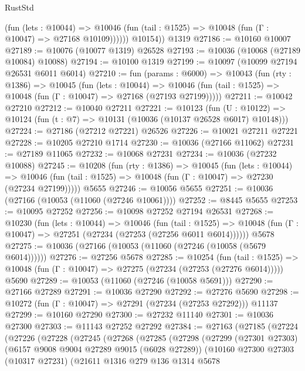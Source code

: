\begin{lexlean}{RustStd}
\begin{coremodule}
{{              (fun (lets : @10044) =>
              @10046 (fun (tail : @1525) => @10048 (fun (Γ : @10047) => @27168 @10109))))))
        @10154))
    @1319
@27186 := @10160 @10007
@27189 := @10076 (@10077 @1319) @26528
@27193 := @10036 (@10068 (@27189 @10084) @10088)
@27194 := @10100 @1319
@27199 := @10097 (@10099 @27194 @26531 @6011 @6014)
@27210 := fun (params : @6000) =>
  @10043
    (fun (rty : @1386) =>
    @10045
      (fun (lets : @10044) =>
      @10046 (fun (tail : @1525) => @10048 (fun (Γ : @10047) => @27168 (@27193 @27199)))))
@27211 := @10042 @27210
@27212 := @10040 @27211
@27221 := @10123
    (fun (U : @10122) => @10124 (fun (t : @7) => @10131 (@10036 (@10137 @26528 @6017) @10148)))
@27224 := @27186 (@27212 @27221) @26526
@27226 := @10021 @27211 @27221
@27228 := @10205 @27210 @1714
@27230 := @10036 (@27166 @11062)
@27231 := @27189 @11065
@27232 := @10068 @27231
@27234 := @10036 (@27232 @10088)
@27245 := @10208
    (fun (rty : @1386) =>
    @10045
      (fun (lets : @10044) =>
      @10046 (fun (tail : @1525) => @10048 (fun (Γ : @10047) => @27230 (@27234 @27199)))))
    @5655
@27246 := @10056 @5655
@27251 := @10036 (@27166 (@10053 (@11060 (@27246 @10061))))
@27252 := @8445 @5655
@27253 := @10095 @27252
@27256 := @10098 @27252 @27194 @26531
@27268 := @10230
    (fun (lets : @10044) =>
    @10046
      (fun (tail : @1525) =>
      @10048 (fun (Γ : @10047) => @27251 (@27234 (@27253 (@27256 @6011 @6014))))))
    @5678
@27275 := @10036 (@27166 (@10053 (@11060 (@27246 (@10058 (@5679 @6014))))))
@27276 := @27256 @5678
@27285 := @10254
    (fun (tail : @1525) => @10048 (fun (Γ : @10047) => @27275 (@27234 (@27253 (@27276 @6014)))))
    @5690
@27289 := @10053 (@11060 (@27246 (@10058 @5691)))
@27290 := @27166 @27289
@27291 := @10036 @27290
@27292 := @27276 @5690
@27298 := @10272 (fun (Γ : @10047) => @27291 (@27234 (@27253 @27292))) @11137
@27299 := @10160 @27290
@27300 := @27232 @11140
@27301 := @10036 @27300
@27303 := @11143 @27252 @27292
@27384 := @27163
    (@27185
      (@27224
        (@27226
          (@27228
            (@27245
              (@27268
                (@27285
                  (@27298
                    (@27299
                      (@27301 @27303)
                      (@6157 @9008 @9004 @27289 @9015 (@6028 @27289))
                      (@10160
                        @27300
                        @27303
                        (@10317 @27231)
                        (@21611
                          @1316
                          @279
                          @136
                          @1314
                          @5678
}}
\end{coremodule}
\end{lexlean}
